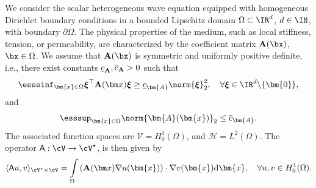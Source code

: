 
\begin{example}\label{example:scalar_wave}
We consider the scalar heterogeneous wave equation equipped with homogeneous Dirichlet boundary conditions in a bounded Lipschitz domain $\Omega \subset \IR^d$, $d \in \IN$, with boundary $\partial \Omega$. 
The physical properties of the medium, such as local stiffness, tension, or permeability, are characterized by the coefficient matrix ${\bf A}(\bx)$, $\bx\in\Omega$. 
We assume that ${\bf A}(\bx)$ is symmetric and uniformly positive definite, i.e., there exist constants $\underline{c}_{{\bf A}}, \overline{c}_{\bf A}>0$ such that 
\begin{equation}\label{eq:elliptic_c}
	\esssinf_{\bm{x} \in \Omega} 
	\boldsymbol\xi^\top 
	{\bf A}({\bm x}) 
	\boldsymbol\xi 
	\geq 
	\underline{c}_{\bm{A}}
    \norm{\boldsymbol\xi}^2_2, 
	\quad \forall \boldsymbol\xi \in \IR^{d} \backslash \{\bm{0}\},
\end{equation}	
and
\begin{equation}\label{eq:continuous_c}
	\esssup_{\bm{x}\in \Omega} 
	\norm{
		\bm{A}(\bm{x}) 
	}_2
	\leq
	\overline{c}_{\bm{A}}.
\end{equation}
The associated function spaces are $\mathcal{V} = H^1_0(\Omega)$, and $\mathcal{H} = L^2(\Omega)$.
The operator $\mathsf{A}:\cV\to \cV^\star$, is then given by
\begin{align*}%
	\langle \mathsf{A}u,v\rangle_{\cV^\star\times \cV} 
	= 
	\int\limits_{\Omega}
    \left(
        {\bf A}({\bm x})
        \nabla u(\bm{x})
	\right)
    \cdot
	{\nabla v(\bm{x})}
	\text{d}\bm{x},
	\quad
    \forall
	u,v \in H^1_0(\Omega).
\end{align*}
\end{example}
